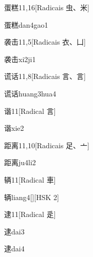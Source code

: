 \begin{entry}{蛋糕}{11,16}[Radicais ⾍、⽶]
  \begin{phonetics}{蛋糕}{dan4gao1}
  \end{phonetics}
\end{entry}

\begin{entry}{袭击}{11,5}[Radicais ⾐、⼐]
  \begin{phonetics}{袭击}{xi2ji1}
  \end{phonetics}
\end{entry}

\begin{entry}{谎话}{11,8}[Radicais ⾔、⾔]
  \begin{phonetics}{谎话}{huang3hua4}
  \end{phonetics}
\end{entry}

\begin{entry}{谐}{11}[Radical ⾔]
  \begin{phonetics}{谐}{xie2}
  \end{phonetics}
\end{entry}

\begin{entry}{距离}{11,10}[Radicais ⾜、⼇]
  \begin{phonetics}{距离}{ju4li2}
  \end{phonetics}
\end{entry}

\begin{entry}{辆}{11}[Radical ⾞]
  \begin{phonetics}{辆}{liang4}[][HSK 2]
  \end{phonetics}
\end{entry}

\begin{entry}{逮}{11}[Radical ⾡]
  \begin{phonetics}{逮}{dai3}
  \end{phonetics}
  \begin{phonetics}{逮}{dai4}
  \end{phonetics}
\end{entry}

